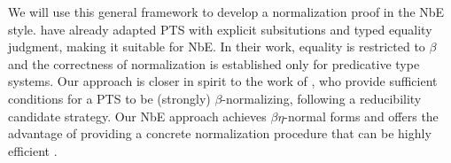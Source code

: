 We will use this general framework to develop a normalization proof in the \ac{NbE} style.
\citet{FP15} have already adapted \acs{PTS} with explicit subsitutions and typed equality judgment, making it suitable for \ac{NbE}.
In their work, equality is restricted to $\beta$ and the correctness of normalization is established only for predicative type systems.
Our approach is closer in spirit to the work of \citet{MW96},
  who provide sufficient conditions for a \ac{PTS} to be (strongly) $\beta$-normalizing, following a reducibility candidate strategy.
Our \ac{NbE} approach achieves $\beta\eta$-normal forms and offers the advantage of providing a concrete normalization procedure that can be highly efficient \citep{BES98}.
  
